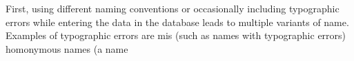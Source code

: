 
















First, using different naming conventions or occasionally including typographic errors while entering the data in the database leads to multiple variants of name.
Examples of typographic errors are mis
(such as names with typographic errors) homonymous names (a name

